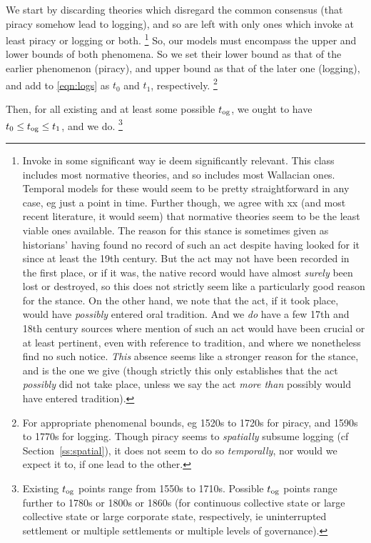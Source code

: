 		We start by discarding theories which disregard the common consensus (that piracy somehow lead to logging), and so are left with only ones which invoke at least piracy or logging or both.%
		\footnote{Invoke in some significant way ie deem significantly relevant. This class includes most normative theories, and so includes most Wallacian ones. Temporal models for these would seem to be pretty straightforward in any case, eg just a point in time. Further though, we agree with xx (and most recent literature, it would seem) that normative theories seem to be the least viable ones available. The reason for this stance is sometimes given as historians' having found no record of such an act despite having looked for it since at least the 19th century. But the act may not have been recorded in the first place, or if it was, the native record would have almost \emph{surely} been lost or destroyed, so this does not strictly seem like a particularly good reason for the stance. On the other hand, we note that the act, if it took place, would have \emph{possibly} entered oral tradition. And we \emph{do} have a few 17th and 18th century sources where mention of such an act would have been crucial or at least pertinent, even with reference to tradition, and where we nonetheless find no such notice. \emph{This} absence seems like a stronger reason for the stance, and is the one we give (though strictly this only establishes that the act \emph{possibly} did not take place, unless we say the act \emph{more than} possibly would have entered tradition).}
		So, our models must encompass the upper and lower bounds of both phenomena. So we set their lower bound as that of the earlier phenomenon (piracy), and upper bound as that of the later one (logging), and add to \ref{eqn:logs} as  \(t_0\) and \(t_1\), respectively.%
		\footnote{For appropriate phenomenal bounds, eg 1520s to 1720s for piracy, and 1590s to 1770s for logging.  Though piracy seems to \emph{spatially} subsume logging (cf Section~\ref{ss:spatial}), it does not seem to do so \emph{temporally}, nor would we expect it to, if one lead to the other.}
		
		
		Then, for all existing and at least some possible \(t_{\operatorname{og}}\), we ought to have \(t_0\leq t_{\operatorname{og}}\leq t_1\), and we do.%
		\footnote{Existing \(t_{\operatorname{og}}\) points range from 1550s to 1710s. Possible \(t_{\operatorname{og}}\) points range further to 1780s or 1800s or 1860s (for continuous collective state or large collective state or large corporate state, respectively, ie uninterrupted settlement or multiple settlements or multiple levels of governance).}
		
